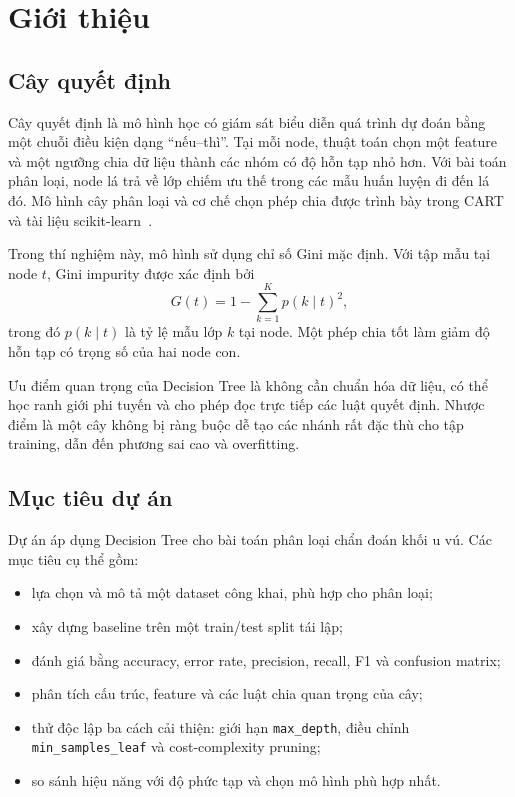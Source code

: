 \chapter{Giới thiệu}
\label{chap:introduction}

\section{Cây quyết định}

Cây quyết định là mô hình học có giám sát biểu diễn quá trình dự đoán bằng một
chuỗi điều kiện dạng ``nếu--thì''. Tại mỗi node, thuật toán chọn một feature và
một ngưỡng chia dữ liệu thành các nhóm có độ hỗn tạp nhỏ hơn. Với bài toán phân
loại, node lá trả về lớp chiếm ưu thế trong các mẫu huấn luyện đi đến lá đó.
Mô hình cây phân loại và cơ chế chọn phép chia được trình bày trong CART và tài
liệu scikit-learn~\cite{breiman-cart,sklearn-tree}.

Trong thí nghiệm này, mô hình sử dụng chỉ số Gini mặc định. Với tập mẫu tại
node $t$, Gini impurity được xác định bởi
\begin{equation}
  G(t)=1-\sum_{k=1}^{K}p(k\mid t)^2,
\end{equation}
trong đó $p(k\mid t)$ là tỷ lệ mẫu lớp $k$ tại node. Một phép chia tốt làm giảm
độ hỗn tạp có trọng số của hai node con.

Ưu điểm quan trọng của Decision Tree là không cần chuẩn hóa dữ liệu, có thể học
ranh giới phi tuyến và cho phép đọc trực tiếp các luật quyết định. Nhược điểm là
một cây không bị ràng buộc dễ tạo các nhánh rất đặc thù cho tập training, dẫn
đến phương sai cao và overfitting.

\section{Mục tiêu dự án}

Dự án áp dụng Decision Tree cho bài toán phân loại chẩn đoán khối u vú. Các
mục tiêu cụ thể gồm:

\begin{itemize}
  \item lựa chọn và mô tả một dataset công khai, phù hợp cho phân loại;
  \item xây dựng baseline trên một train/test split tái lập;
  \item đánh giá bằng accuracy, error rate, precision, recall, F1 và confusion
  matrix;
  \item phân tích cấu trúc, feature và các luật chia quan trọng của cây;
  \item thử độc lập ba cách cải thiện: giới hạn \texttt{max\_depth}, điều chỉnh
  \texttt{min\_samples\_leaf} và cost-complexity pruning;
  \item so sánh hiệu năng với độ phức tạp và chọn mô hình phù hợp nhất.
\end{itemize}

